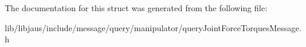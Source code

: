 \-The documentation for this struct was generated from the following file\-:\begin{DoxyCompactItemize}
\item 
lib/libjaus/include/message/query/manipulator/query\-Joint\-Force\-Torques\-Message.\-h\end{DoxyCompactItemize}

